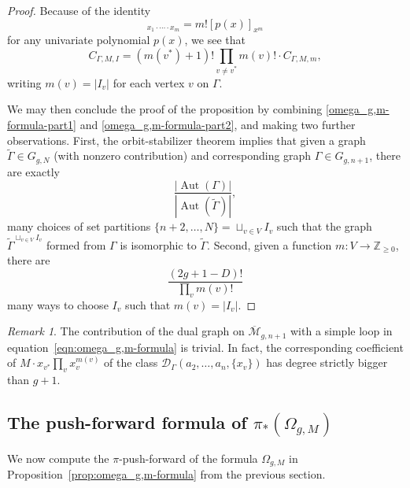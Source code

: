 \documentclass[12pt,reqno]{amsart}
\DeclareMathOperator{\Aut}{Aut}
\theoremstyle{plain}
\theoremstyle{definition}
\theoremstyle{remark}
\newtheorem{remark}[theorem]{Remark}
\begin{document}
\begin{proof}
  Because of the identity
  \begin{equation*}
    [p(x_1 + \dotsb + x_m)]_{x_1 \cdot \dotsb \cdot x_m}
    = m! [p(x)]_{x^m}
  \end{equation*}
  for any univariate polynomial $p(x)$, we see that
  \begin{equation}
    \label{omega_g,m-formula-part2}
    C_{\Gamma, M, I} = (m(v^*) + 1)! \prod_{v \neq v^*} m(v)! \cdot C_{\Gamma, M, m},
  \end{equation}
  writing $m(v) = |I_v|$ for each vertex $v$ on $\Gamma$.

  We may then conclude the proof of the proposition by combining
  \eqref{omega_g,m-formula-part1} and \eqref{omega_g,m-formula-part2},
  and making two further observations.
  First, the orbit-stabilizer theorem implies that given a graph
  $\widetilde\Gamma \in G_{g, N}$ (with nonzero contribution) and
  corresponding graph $\Gamma \in G_{g, n + 1}$, there are exactly
  \begin{equation*}
    \frac{|\Aut(\Gamma)|}{|\Aut(\widetilde\Gamma)|},
  \end{equation*}
  many choices of set partitions
  $\{n+2, \ldots, N\} = \sqcup_{v\in V} I_v$ such that the graph
  $\widetilde\Gamma^{\sqcup_{v\in V}I_v}$ formed from $\Gamma$ is
  isomorphic to $\widetilde\Gamma$.
  Second, given a function $m\colon V \to \mathbb{Z}_{\ge 0}$, there
  are
  \begin{equation*}
    \frac{(2g + 1 - D)!}{\prod_v m(v)!}
  \end{equation*}
  many ways to choose $I_v$ such that $m(v) = |I_v|$.
\end{proof}
\begin{remark}\label{rem:contr-asimple-loop}
  The contribution of the dual graph on $\overline{\mathcal{M}}_{g,n+1}$ with a simple loop in equation~\ref{eqn:omega_g,m-formula} is trivial.
  In fact, the corresponding coefficient  of $M\cdot x_{v^*}\prod_{v}x_v^{m(v)}$ of the class $\mathcal{D}_{\Gamma}(a_2,\dots ,a_n,\{x_v\})$ has degree
strictly bigger than $g+1$.
\end{remark}
\subsection{The push-forward formula of $\pi_*(\Omega_{g,M})$}

We now compute the $\pi$-push-forward of the formula $\Omega_{g,M}$ in Proposition~\ref{prop:omega_g,m-formula} from the previous
section.
\end{document}
